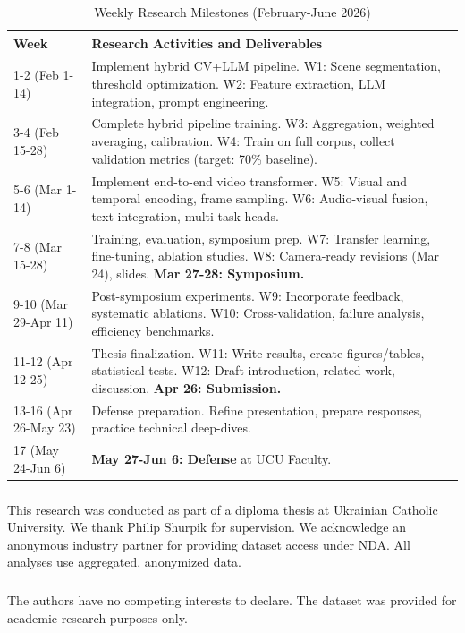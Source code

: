 \documentclass[runningheads]{llncs}
\begin{document}
\begin{table}[t]
\centering
\caption{Weekly Research Milestones (February-June 2026)}\label{tab:timeline}
\footnotesize
\begin{tabular}{lp{8.5cm}}
\toprule
\textbf{Week} & \textbf{Research Activities and Deliverables} \\
\midrule
1-2 (Feb 1-14) & Implement hybrid CV+LLM pipeline. W1: Scene segmentation, threshold optimization. W2: Feature extraction, LLM integration, prompt engineering. \\
\midrule
3-4 (Feb 15-28) & Complete hybrid pipeline training. W3: Aggregation, weighted averaging, calibration. W4: Train on full corpus, collect validation metrics (target: 70\% baseline). \\
\midrule
5-6 (Mar 1-14) & Implement end-to-end video transformer. W5: Visual and temporal encoding, frame sampling. W6: Audio-visual fusion, text integration, multi-task heads. \\
\midrule
7-8 (Mar 15-28) & Training, evaluation, symposium prep. W7: Transfer learning, fine-tuning, ablation studies. W8: Camera-ready revisions (Mar 24), slides. \textbf{Mar 27-28: Symposium.} \\
\midrule
9-10 (Mar 29-Apr 11) & Post-symposium experiments. W9: Incorporate feedback, systematic ablations. W10: Cross-validation, failure analysis, efficiency benchmarks. \\
\midrule
11-12 (Apr 12-25) & Thesis finalization. W11: Write results, create figures/tables, statistical tests. W12: Draft introduction, related work, discussion. \textbf{Apr 26: Submission.} \\
\midrule
13-16 (Apr 26-May 23) & Defense preparation. Refine presentation, prepare responses, practice technical deep-dives. \\
\midrule
17 (May 24-Jun 6) & \textbf{May 27-Jun 6: Defense} at UCU Faculty.  \\
\bottomrule
\end{tabular}
\end{table}

\begin{credits}
\subsubsection{\ackname} 
This research was conducted as part of a diploma thesis at Ukrainian Catholic University. We thank Philip Shurpik for supervision. We acknowledge an anonymous industry partner for providing dataset access under NDA. All analyses use aggregated, anonymized data.

\subsubsection{\discintname}
The authors have no competing interests to declare. The dataset was provided for academic research purposes only.
\end{credits}
\end{document}
